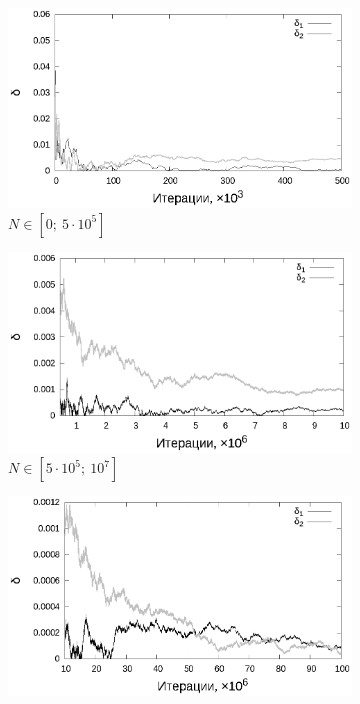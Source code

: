 \documentclass[11pt,a4paper]{article}
\theoremstyle{definition}
\begin{document}
\begin{figure}[h!]
  \begin{subfigure}[b]{0.3\textwidth}
    \includegraphics[width=\textwidth]{figs/classic/linear_log_10x_3_samples_50_variance_1_norm.log_0_500.eps}
    \caption{$N \in [0;~5 \cdot 10^5]$}
    \label{fig:classic_var1_n50_begin}
  \end{subfigure}
  \begin{subfigure}[b]{0.3\textwidth}
    \includegraphics[width=\textwidth]{figs/classic/linear_log_10x_3_samples_50_variance_1_norm.log_500_10000.eps}
    \caption{$N \in [5 \cdot 10^5;~10^7]$}
    \label{fig:classic_var1_n50_middle}
  \end{subfigure}
  \begin{subfigure}[b]{0.3\textwidth}
    \includegraphics[width=\textwidth]{figs/classic/linear_log_10x_3_samples_50_variance_1_norm.log_end.eps}

\end{subfigure}
\end{figure}
\end{document}
